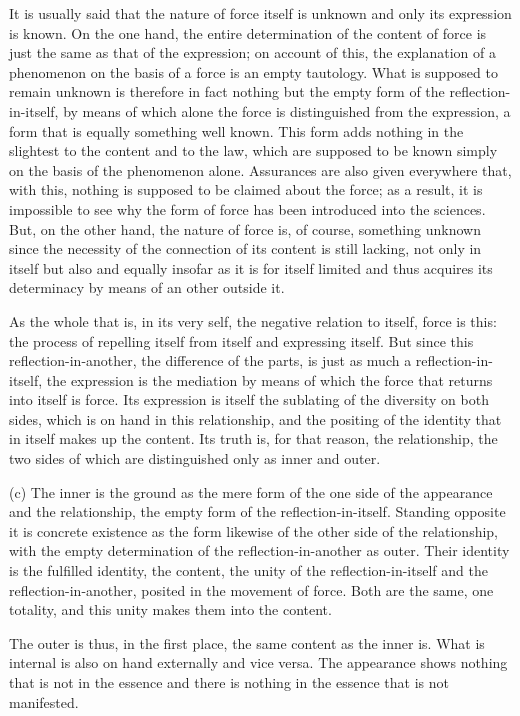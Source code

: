     It is usually said that the nature of force itself is unknown
    and only its expression is known.
    On the one hand, the entire determination of the content of force is
    just the same as that of the expression;
    on account of this, the explanation of a phenomenon
    on the basis of a force is an empty tautology.
    What is supposed to
    remain unknown is therefore in fact nothing but the empty form
    of the reflection-in-itself, by means of which alone the force is
    distinguished from the expression, a form that is equally
    something well known.
    This form adds nothing in the slightest to the content and to the law,
    which are supposed to be known simply on the basis of the phenomenon alone.
    Assurances are also given everywhere that, with this, nothing is
    supposed to be claimed about the force; as a result, it is impossible to
    see why the form of force has been introduced into the sciences.
    But, on the other hand, the nature of force is, of course, something
    unknown since the necessity of the connection of its content is still
    lacking, not only in itself but also and equally insofar as it is for itself
    limited and thus acquires its determinacy by means of an other outside it.

As the whole that is, in its very self,
the negative relation to itself, force is this:
the process of repelling itself from itself
and expressing itself.
But since this reflection-in-another,
the difference of the parts,
is just as much a reflection-in-itself,
the expression is the mediation by means of which
the force that returns into itself is force.
Its expression is itself the sublating of
the diversity on both sides,
which is on hand in this relationship,
and the positing of the identity
that in itself makes up the content.
Its truth is, for that reason, the relationship,
the two sides of which are distinguished only as inner and outer.

(c) The inner is the ground as the mere form
of the one side of the appearance and the relationship,
the empty form of the reflection-in-itself.
Standing opposite it is concrete existence as the form likewise
of the other side of the relationship,
with the empty determination of the
reflection-in-another as outer.
Their identity is the fulfilled identity, the content,
the unity of the reflection-in-itself and
the reflection-in-another,
posited in the movement of force.
Both are the same, one totality,
and this unity makes them into the content.

The outer is thus, in the first place, the same content as the inner is.
What is internal is also on hand externally and vice versa.
The appearance shows nothing that is not in the essence and
there is nothing in the essence that is not manifested.

